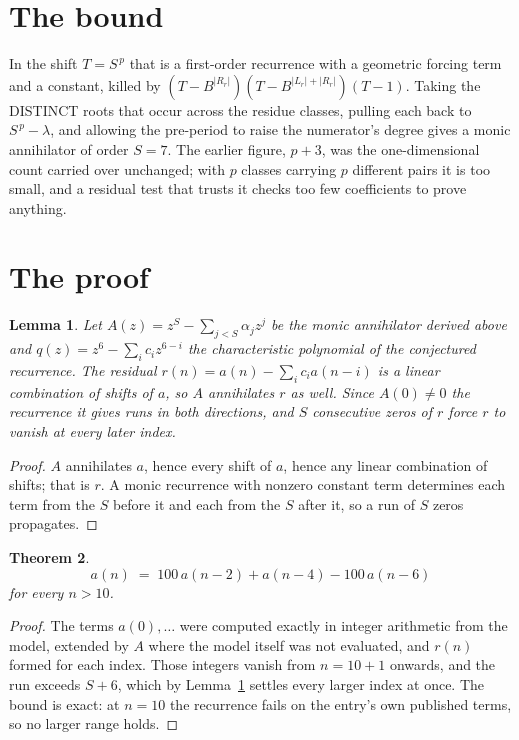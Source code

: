 \documentclass[11pt,a4paper]{article}
\theoremstyle{plain}
\newtheorem{theorem}{Theorem}
\newtheorem{lemma}[theorem]{Lemma}
\theoremstyle{definition}
\begin{document}
\section{The bound}

In the shift $T=S^{\,p}$ that is a first-order recurrence with a geometric forcing term and a
constant, killed by $(T-B^{|R_r|})(T-B^{|L_r|+|R_r|})(T-1)$. Taking the DISTINCT roots that
occur across the residue classes, pulling each back to $S^{\,p}-\lambda$, and allowing the
pre-period to raise the numerator's degree gives a monic annihilator of order $S=7$. The
earlier figure, $p+3$, was the one-dimensional count carried over unchanged; with $p$ classes
carrying $p$ different pairs it is too small, and a residual test that trusts it checks too few
coefficients to prove anything.

\section{The proof}

\begin{lemma}\label{lem:crit}
Let $A(z)=z^S-\sum_{j<S}\alpha_jz^{j}$ be the monic annihilator derived above and
$q(z)=z^{6}-\sum_ic_iz^{6-i}$ the characteristic polynomial of the conjectured
recurrence. The residual $r(n)=a(n)-\sum_ic_ia(n-i)$ is a linear combination of shifts of $a$,
so $A$ annihilates $r$ as well. Since $A(0)\ne0$ the recurrence it gives runs in both
directions, and $S$ consecutive zeros of $r$ force $r$ to vanish at every later index.
\end{lemma}

\begin{proof}
$A$ annihilates $a$, hence every shift of $a$, hence any linear combination of shifts; that is
$r$. A monic recurrence with nonzero constant term determines each term from the $S$ before it
and each from the $S$ after it, so a run of $S$ zeros propagates.
\end{proof}

\begin{theorem}
\[
a(n)\;=\;100\,a(n-2) + a(n-4) - 100\,a(n-6)
\]
for every $n>10$.
\end{theorem}

\begin{proof}
The terms $a(0),\dots$ were computed exactly in integer arithmetic from the model, extended by
$A$ where the model itself was not evaluated, and $r(n)$ formed for each index. Those integers
vanish from $n=10+1$ onwards, and the run exceeds $S+6$, which by
Lemma~\ref{lem:crit} settles every larger index at once. The bound is exact: at $n=10$ the recurrence fails on the entry's own published terms, so no larger range holds.
\end{proof}
\end{document}
